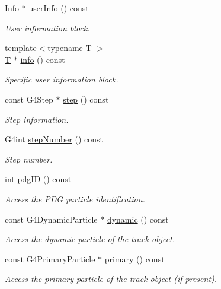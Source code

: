 \begin{DoxyCompactItemize}
\hyperlink{class_g4_v_user_track_information}{Info} $\ast$ \hyperlink{class_d_d4hep_1_1_simulation_1_1_geant4_track_handler_afb2d00560f0fda5d1b9b1323e56adefb}{userInfo} () const 
\begin{DoxyCompactList}\small\item\em User information block. \item\end{DoxyCompactList}\item 
{\footnotesize template$<$typename T $>$ }\\\hyperlink{class_t}{T} $\ast$ \hyperlink{class_d_d4hep_1_1_simulation_1_1_geant4_track_handler_a32b937f003ac5ca77676fcd2486279e4}{info} () const 
\begin{DoxyCompactList}\small\item\em Specific user information block. \item\end{DoxyCompactList}\item 
const G4Step $\ast$ \hyperlink{class_d_d4hep_1_1_simulation_1_1_geant4_track_handler_a751a9e1a533202afb900064702e76e61}{step} () const 
\begin{DoxyCompactList}\small\item\em Step information. \item\end{DoxyCompactList}\item 
G4int \hyperlink{class_d_d4hep_1_1_simulation_1_1_geant4_track_handler_aa9746a4283a024869e1cdedf62231926}{stepNumber} () const 
\begin{DoxyCompactList}\small\item\em Step number. \item\end{DoxyCompactList}\item 
int \hyperlink{class_d_d4hep_1_1_simulation_1_1_geant4_track_handler_a929075b1a75bdab50f4e69a19d5b6931}{pdgID} () const 
\begin{DoxyCompactList}\small\item\em Access the PDG particle identification. \item\end{DoxyCompactList}\item 
const G4DynamicParticle $\ast$ \hyperlink{class_d_d4hep_1_1_simulation_1_1_geant4_track_handler_a3348efba5ab5cda2b8d918974482fe63}{dynamic} () const 
\begin{DoxyCompactList}\small\item\em Access the dynamic particle of the track object. \item\end{DoxyCompactList}\item 
const G4PrimaryParticle $\ast$ \hyperlink{class_d_d4hep_1_1_simulation_1_1_geant4_track_handler_a62a4f0316aff9faca83efe0f86e35793}{primary} () const 
\begin{DoxyCompactList}\small\item\em Access the primary particle of the track object (if present). \item\end{DoxyCompactList}\end{DoxyCompactItemize}

